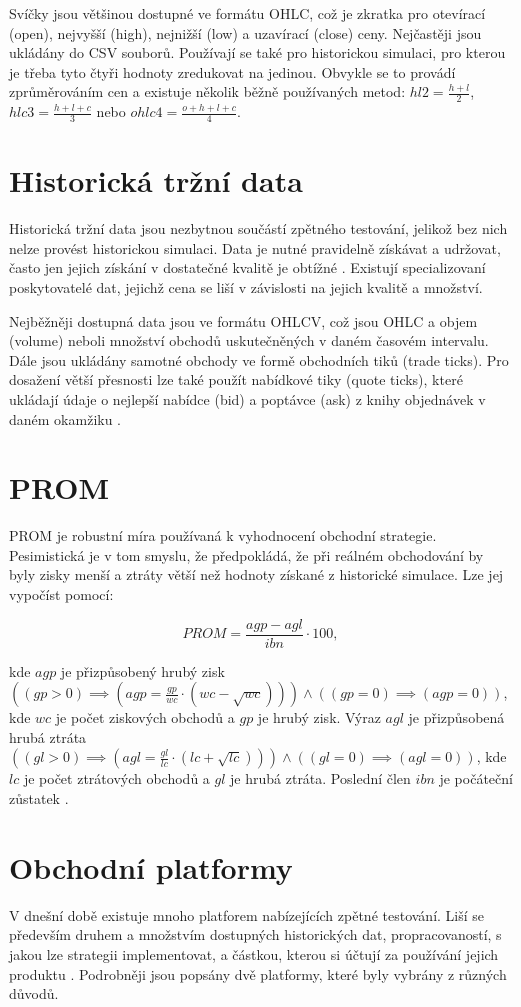 Svíčky jsou většinou dostupné ve formátu OHLC, což je zkratka pro otevírací (open), nejvyšší (high), nejnižší (low) a uzavírací (close) ceny.
Nejčastěji jsou ukládány do CSV souborů.
Používají se také pro historickou simulaci, pro kterou je třeba tyto čtyři hodnoty zredukovat na jedinou.
Obvykle se to provádí zprůměrováním cen a existuje několik běžně používaných metod: \mbox{$hl2=\frac{h+l}{2}$}, $hlc3=\frac{h+l+c}{3}$ nebo $ohlc4=\frac{o+h+l+c}{4}$.

\section{Historická tržní data}
Historická tržní data jsou nezbytnou součástí zpětného testování, jelikož bez nich nelze provést historickou simulaci.
Data je nutné pravidelně získávat a udržovat, často jen jejich získání v dostatečné kvalitě je obtížné \cite{pardo}.
Existují specializovaní poskytovatelé dat, jejichž cena se liší v závislosti na jejich kvalitě a množství.

Nejběžněji dostupná data jsou ve formátu OHLCV, což jsou OHLC a objem (volume) neboli množství obchodů uskutečněných v daném časovém intervalu.
Dále jsou ukládány samotné obchody ve formě obchodních tiků (trade ticks).
Pro dosažení větší přesnosti lze také použít nabídkové tiky (quote ticks), které ukládají údaje o nejlepší nabídce (bid) a poptávce (ask) z knihy objednávek v daném okamžiku \cite{polygon}.

\section{PROM}
PROM je robustní míra používaná k vyhodnocení obchodní strategie.
Pesimistická je v tom smyslu, že předpokládá, že při reálném obchodování by byly zisky menší a ztráty větší než hodnoty získané z historické simulace.
Lze jej vypočíst pomocí:

\[ PROM = \frac{agp-agl}{ibn} \cdot 100,\]

kde $agp$ je přizpůsobený hrubý zisk $((gp>0)\implies(agp=\frac{gp}{wc}\cdot(wc-\sqrt{wc}))) \land ((gp=0)\implies(agp=0))$, kde $wc$ je počet ziskových obchodů a $gp$ je hrubý zisk.
Výraz $agl$ je přizpůsobená hrubá ztráta $((gl>0)\implies(agl=\frac{gl}{lc}\cdot(lc+\sqrt{lc}))) \land ((gl=0)\implies(agl=0))$, kde $lc$ je počet ztrátových obchodů a $gl$ je hrubá ztráta.
Poslední člen $ibn$ je počáteční zůstatek \cite{pardo}.

\section{Obchodní platformy}
V dnešní době existuje mnoho platforem nabízejících zpětné testování.
Liší se především druhem a množstvím dostupných historických dat, propracovaností, s jakou lze strategii implementovat, a částkou, kterou si účtují za používání jejich produktu \cite{bowman}.
Podrobněji jsou popsány dvě platformy, které byly vybrány z různých důvodů.


